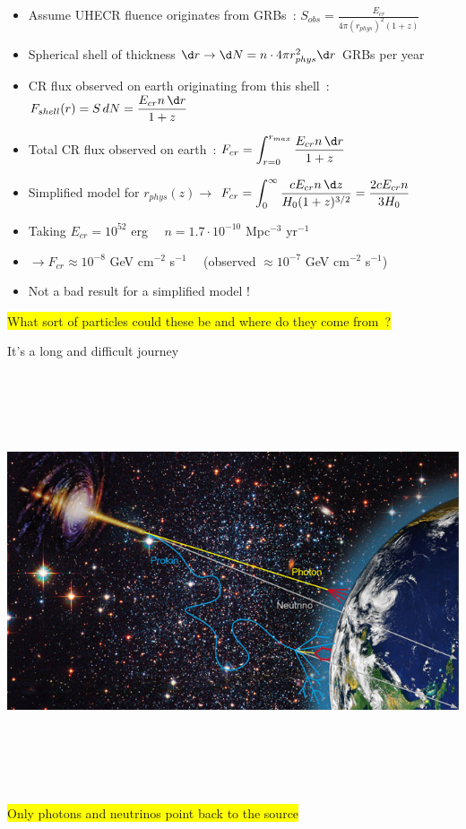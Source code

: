 \onecolumn

\begin{itemize}
\item Assume UHECR fluence originates from GRBs~:
      $\displaystyle S_{obs}=\frac{E_{cr}}{4\pi (r_{phys})^{2}(1+z)}$\\[1mm]
\item Spherical shell of thickness $\d r \rightarrow \d N=n \cdot 4\pi r_{phys}^{2} \d r$ GRBs per year
\item CR flux observed on earth originating from this shell~:
      $\displaystyle F_{shell}(r)=S\,dN=\frac{E_{cr}n\,\d r}{1+z}$
\item Total CR flux observed on earth~:
      $\displaystyle F_{cr}=\int_{r=0}^{r_{max}} \frac{E_{cr}n\,\d r}{1+z}$
\item Simplified model for $r_{phys}(z) \rightarrow$
      $\displaystyle F_{cr}=\int_{0}^{\infty} \frac{c E_{cr} n \, \d z}{H_{0}(1+z)^{3/2}}
       =\frac{2cE_{cr}n}{3H_{0}}$
\item Taking $E_{cr}=10^{52}$ erg $\quad n=1.7 \cdot 10^{-10}$ Mpc$^{-3}$ yr$^{-1}$
\item[] $\rightarrow F_{cr} \approx 10^{-8}$ GeV cm$^{-2}$ s$^{-1} \quad$
        (observed $\approx 10^{-7}$ GeV cm$^{-2}$ s$^{-1}$)
\item[] Not a bad result for a simplified model !
\end{itemize}

\begin{center}
\colorbox{yellow}{What sort of particles could these be and where do they come from~?}
\end{center}

\Tr
\onecolumn
\begin{center}
{\blue It's a long and difficult journey}\\[5mm]
\includegraphics[keepaspectratio,height=13cm]{app}\\[5mm]
\colorbox{yellow}{Only photons and neutrinos point back to the source}
\end{center}

